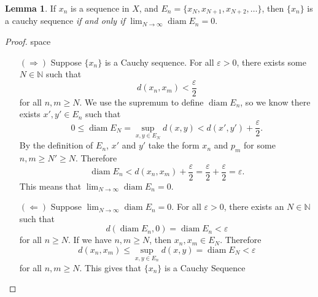 \documentclass{article}
\newcommand{\N}{\mathbb{N}}
\DeclareMathOperator{\diam}{diam}
\theoremstyle{definition}
\newtheorem{lemma}{Lemma}[section]
\begin{document}
	\begin{lemma}
		If $ x_n $ is a sequence in $ X $, and $ E_n=\{x_N,x_{N+1},x_{N+2},\ldots\} $, then $ \{x_n\} $ is a cauchy sequence \textit{if and only if} $ \lim_{N\to\infty}\diam E_n=0 $. 
	\end{lemma}
	\begin{proof}{\color{white}space}
		\begin{enumerate}
			\item [$ (\Longrightarrow) $] Suppose $ \{x_n\} $ is a Cauchy sequence.  For all $ \varepsilon>0 $, there exists some $ N\in\N $ such that $$d(x_n,x_m)<\frac{\varepsilon}{2} $$ for all $ n,m\ge N $. We use the supremum to define $ \diam E_n $, so we know there exists $ x',y'\in E_n $ such that $$0\le\diam E_N=\sup\limits_{x,y\in E_N}d(x,y)<d(x',y')+\frac{\varepsilon}{2} .$$ By the definition of $ E_n $, $ x' $ and $ y' $ take the form $ x_n $ and $ p_m $ for some $ n,m\ge N'\ge N $. Therefore $$\diam E_n<d(x_n,x_m)+\frac{\varepsilon}{2}=\frac{\varepsilon}{2}+\frac{\varepsilon}{2}=\varepsilon .$$ This means that  $ \lim_{N\to\infty}\diam E_n=0 $.
			\item [$ (\Longleftarrow) $] Suppose $ \lim_{N\to\infty}\diam E_n=0 $. For all $ \varepsilon>0 $, there exists an $ N\in\N $ such that $$ d(\diam E_n,0)=\diam E_n<\varepsilon$$ for all $ n\ge N $. If we have $ n,m\ge N $, then $ x_n,x_m\in E_N $. Therefore $$ d(x_n,x_m)\le\sup\limits_{x,y\in E_n}d(x,y)=\diam E_N<\varepsilon$$ for all $ n,m\ge N $. This gives that $ \{x_n\} $ is a Cauchy Sequence   
		\end{enumerate}
	\end{proof}
\end{document}
